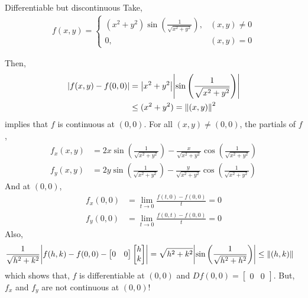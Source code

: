 \documentclass[../Analysis-3]{subfiles}
\begin{document}
\begin{Eg}{Differentiable but discontinuous}{}
  Take, \begin{align*}
    f(x,y) = \begin{cases}
               \left( x^2+y^2 \right)\sin{\left( \frac{1}{\sqrt{x^2+y^2}} \right)}, & (x,y) \not= 0 \\
               0,                                                                   & (x,y) = 0
             \end{cases}
  \end{align*}

  Then, \begin{align*}
    \abs{f(x,y) - f(0,0)}
     & = \abs{x^2+y^2}\abs{\sin{\left( \frac{1}{\sqrt{x^2+y^2}} \right)}} \\
     & \leq (x^2+y^2) = \norm{(x,y)}^2
  \end{align*}
  implies that $ f $ is continuous at $ (0,0) $. For all $ (x,y) \not= (0,0) $, the partials of $ f $, \begin{align*}
    f_x(x,y) & = 2x\sin{\left( \frac{1}{\sqrt{x^2+y^2}} \right)} - \frac{x}{\sqrt{x^2+y^2}}\cos{\left( \frac{1}{\sqrt{x^2+y^2}} \right)} \\
    f_y(x,y) & = 2y\sin{\left( \frac{1}{\sqrt{x^2+y^2}} \right)} - \frac{y}{\sqrt{x^2+y^2}}\cos{\left( \frac{1}{\sqrt{x^2+y^2}} \right)}
  \end{align*}
  And at $(0,0)$, \begin{align*}
    f_x(0,0) & = \lim_{t \to 0} \frac{f(t,0) - f(0,0)}{t} = 0 \\
    f_y(0,0) & = \lim_{t \to 0} \frac{f(0,t) - f(0,0)}{t} = 0
  \end{align*}
  Also, \begin{align*}
    \frac{1}{\sqrt{h^2+k^2}}\abs{f(h,k) - f(0,0) - \begin{bmatrix} 0 & 0 \end{bmatrix}\begin{bmatrix} h \\ k \end{bmatrix}} & = \sqrt{h^2+k^2}\abs{\sin{\left( \frac{1}{\sqrt{h^2+h^2}} \right)}} \leq \norm{(h,k)}
  \end{align*}
  which shows that, $ f $ is differentiable at $ (0,0) $ and $ Df(0,0) = \begin{bmatrix} 0 & 0 \end{bmatrix} $. But, $ f_x $ and $ f_y $ are not continuous at $ (0,0) $!
\end{Eg}
\end{document}
